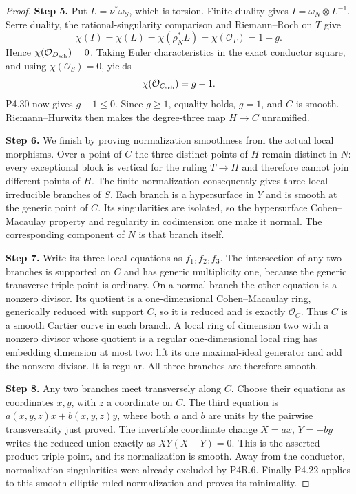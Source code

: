 \begin{proof}
\noindent\textbf{Step 5.} Put $L=\nu^*\omega_S$, which is torsion. Finite duality
gives $I=\omega_N\otimes L^{-1}$. Serre duality, the
rational-singularity comparison and Riemann--Roch on
$T$ give
\[
 \chi(I)=\chi(L)=\chi(\rho_N^*L)
   =\chi(\mathcal O_T)=1-g.
\]
Hence $\chi(\mathcal O_{D_{\rm sch}})=0$.
Taking Euler characteristics in the exact conductor
square, and using $\chi(\mathcal O_S)=0$, yields
\[
 \chi(\mathcal O_{C_{\rm sch}})=g-1.
\]
P4.30 now gives $g-1\le0$. Since $g\ge1$, equality
holds, $g=1$, and $C$ is smooth. Riemann--Hurwitz then
makes the degree-three map $H\to C$ unramified.

\noindent\textbf{Step 6.} We finish by proving normalization smoothness from
the actual local morphisms. Over a point of $C$ the
three distinct points of $H$ remain distinct in $N$:
every exceptional block is vertical for the ruling
$T\to H$ and therefore cannot join different points
of $H$. The finite normalization consequently gives
three local irreducible branches of $S$. Each branch
is a hypersurface in $Y$ and is smooth at the generic
point of $C$. Its singularities are isolated, so the
hypersurface Cohen--Macaulay property and regularity
in codimension one make it normal. The corresponding
component of $N$ is that branch itself.

\noindent\textbf{Step 7.} Write its three local equations as $f_1,f_2,f_3$.
The intersection of any two branches is supported on
$C$ and has generic multiplicity one, because the
generic transverse triple point is ordinary. On a
normal branch the other equation is a nonzero divisor.
Its quotient is a one-dimensional Cohen--Macaulay
ring, generically reduced with support $C$, so it is
reduced and is exactly $\mathcal O_C$. Thus $C$ is a
smooth Cartier curve in each branch. A local ring of
dimension two with a nonzero divisor whose quotient
is a regular one-dimensional local ring has embedding
dimension at most two: lift its one maximal-ideal
generator and add the nonzero divisor. It is regular.
All three branches are therefore smooth.

\noindent\textbf{Step 8.} Any two branches meet transversely along $C$.
Choose their equations as coordinates $x,y$, with
$z$ a coordinate on $C$. The third equation is
$a(x,y,z)x+b(x,y,z)y$, where both $a$ and $b$ are
units by the pairwise transversality just proved.
The invertible coordinate change $X=ax$, $Y=-by$
writes the reduced union exactly as
$XY(X-Y)=0$. This is the asserted product triple
point, and its normalization is smooth. Away from
the conductor, normalization singularities were
already excluded by P4R.6. Finally P4.22 applies to
this smooth elliptic ruled normalization and proves
its minimality.
\end{proof}



